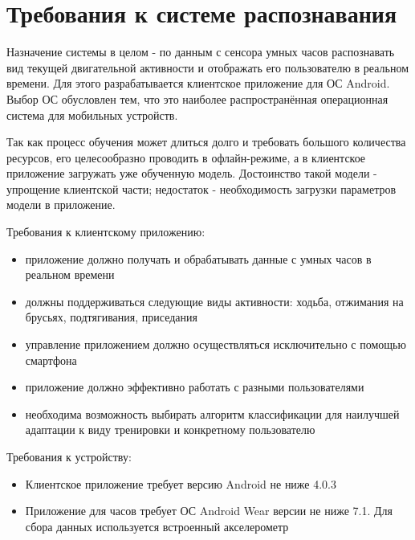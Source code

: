 
\section{Требования к системе распознавания}

Назначение системы в целом - по данным с сенсора умных часов распознавать вид текущей двигательной активности и отображать его пользователю в реальном времени. Для этого разрабатывается клиентское приложение для ОС Android. Выбор ОС обусловлен тем, что это наиболее распространённая операционная система для мобильных устройств. 

Так как процесс обучения может длиться долго и требовать большого количества ресурсов, его целесообразно проводить в офлайн-режиме, а в клиентское приложение загружать уже обученную модель. Достоинство такой модели - упрощение клиентской части; недостаток - необходимость загрузки параметров модели в приложение.

Требования к клиентскому приложению:

\begin{itemize}
\item приложение должно получать и обрабатывать данные с умных часов в реальном времени
\item должны поддерживаться следующие виды активности: ходьба, отжимания на брусьях, подтягивания, приседания
\item управление приложением должно осуществляться исключительно с помощью смартфона
\item приложение должно эффективно работать с разными пользователями
\item необходима возможность выбирать алгоритм классификации для наилучшей адаптации к виду тренировки и конкретному пользователю
\end{itemize}

Требования к устройству:
\begin{itemize}
\item Клиентское приложение требует версию Android не ниже 4.0.3
\item Приложение для часов требует ОС Android Wear версии не ниже 7.1. Для сбора данных используется встроенный акселерометр
\end{itemize}
